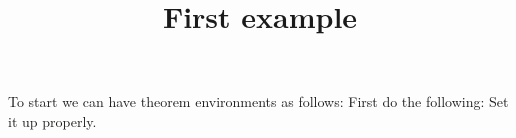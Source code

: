 \documentclass{ximera}
\title{First example}
\begin{document}
\maketitle

To start we can have theorem environments as follows:
First do the following:
Set it up properly.
\end{document}
